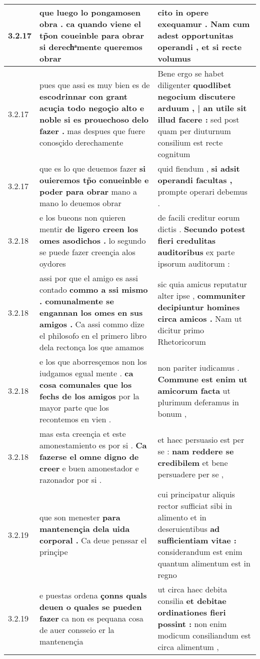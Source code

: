 \begin{tabular}{|p{1cm}|p{6.5cm}|p{6.5cm}|}
3.2.17 & que luego lo pongamosen obra . \textbf{ ca quando viene el tp̃on coueinble para obrar } si derechͣmente queremos obrar & cito in opere exequamur . \textbf{ Nam cum adest opportunitas operandi , } et si recte volumus \\\hline
3.2.17 & pues que assi es muy bien es de \textbf{ escodrinnar con grant acuçia todo negoçio alto e noble si es prouechoso delo fazer . } mas despues que fuere conosçido derechamente & Bene ergo se habet diligenter \textbf{ quodlibet negocium discutere arduum , | an utile sit illud facere : } sed post quam per diuturnum consilium est recte cognitum \\\hline
3.2.17 & que es lo que deuemos fazer \textbf{ si ouieremos tp̃o conueinble e poder para obrar } mano a mano lo deuemos obrar & quid fiendum , \textbf{ si adsit operandi facultas , } prompte operari debemus . \\\hline
3.2.18 & e los bueons non quieren mentir \textbf{ de ligero creen los omes asodichos . } lo segundo se puede fazer creençia alos oydores & de facili creditur eorum dictis . \textbf{ Secundo potest fieri credulitas auditoribus } ex parte ipsorum auditorum : \\\hline
3.2.18 & assi por que el amigo es assi contado \textbf{ commo a ssi mismo . comunalmente se engannan los omes en sus amigos . } Ca assi commo dize el philosofo en el primero libro dela rectonça los que amamos & sic quia amicus reputatur alter ipse , \textbf{ communiter decipiuntur homines circa amicos . } Nam ut dicitur primo Rhetoricorum \\\hline
3.2.18 & e los que aborresçemos non los iudgamos egual mente . \textbf{ ca cosa comunales que los fechs de los amigos } por la mayor parte que los recontemos en vien . & non pariter iudicamus . \textbf{ Commune est enim ut amicorum facta } ut plurimum deferamus in bonum , \\\hline
3.2.18 & mas esta creençia et este amonestamiento es por si . \textbf{ Ca fazerse el omne digno de creer } e buen amonestador e razonador por si . & et haec persuasio est per se : \textbf{ nam reddere se credibilem } et bene persuadere per se , \\\hline
3.2.19 & que son menester \textbf{ para mantenençia dela uida corporal . } Ca deue penssar el prinçipe & cui principatur aliquis rector sufficiat sibi in alimento et in deseruientibus \textbf{ ad sufficientiam vitae : } considerandum est enim quantum alimentum est in regno \\\hline
3.2.19 & e puestas ordena \textbf{ çonns quals deuen o quales se pueden fazer } ca non es pequana cosa de auer consseio er la mantenençia & ut circa haec debita consilia \textbf{ et debitae ordinationes fieri possint : } non enim modicum consiliandum est circa alimentum , \\\hline

\end{tabular}
